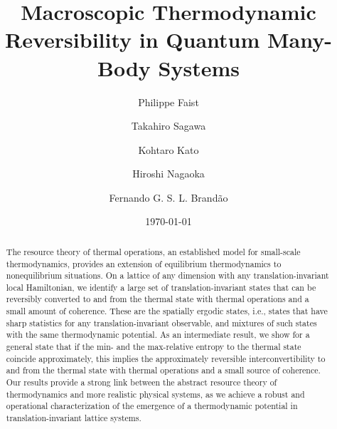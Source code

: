 \documentclass[prl,reprint,longbibliography,superscriptaddress]{revtex4-1}
\begin{document}
\title{Macroscopic Thermodynamic Reversibility in Quantum Many-Body Systems}

\author{Philippe Faist}

\author{Takahiro Sagawa}

\author{Kohtaro Kato}

\author{Hiroshi Nagaoka}

\author{Fernando G. S. L. Brand\~ao}

\date{\today}




\begin{abstract}
  The resource theory of thermal operations, an established model for
  small-scale thermodynamics, provides an extension of equilibrium
  thermodynamics to nonequilibrium situations.  On a lattice of any dimension
  with any translation-invariant local Hamiltonian, we identify a large set of
  translation-invariant states that can be reversibly converted to and from the
  thermal state with thermal operations and a small amount of coherence.  These
  are the spatially ergodic states, i.e., states that have sharp statistics for
  any translation-invariant observable, and mixtures of such states with the
  same thermodynamic potential.  As an intermediate result, we show for a
  general state that if the min- and the max-relative entropy to the thermal
  state coincide approximately, this implies the approximately reversible
  interconvertibility to and from the thermal state with thermal operations and
  a small source of coherence.
  Our results provide a strong link between the abstract resource theory of
  thermodynamics and more realistic physical systems, as we achieve a robust and
  operational characterization of the emergence of a thermodynamic potential in
  translation-invariant lattice systems.
\end{abstract}


\maketitle
\end{document}
